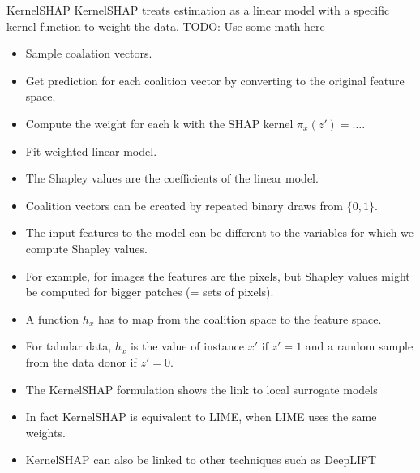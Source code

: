 \documentclass[10pt,compress,t,notes=noshow, xcolor=table]{beamer}
\begin{document}
\begin{vbframe}{KernelSHAP}
KernelSHAP treats estimation as a linear model with a specific kernel function to weight the data. TODO: Use some math here

  \begin{itemize}
    \item Sample coalation vectors.
    \item Get prediction for each coalition vector by converting to the original feature space.
    \item Compute the weight for each k with the SHAP kernel $\pi_x(z') = \ldots $.
    \item Fit weighted linear model.
    \item The Shapley values are the coefficients of the linear model.
  \end{itemize}

\framebreak

\begin{itemize}
  \item Coalition vectors can be created by repeated binary draws from $\{0,1\}$.
  \item The input features to the model can be different to the variables for which we compute Shapley values.
  \item For example, for images the features are the pixels, but Shapley values might be computed for bigger patches (= sets of pixels).
  \item A function $h_x$ has to map from the coalition space to the feature space.
  \item For tabular data, $h_x$ is the value of instance $x'$ if $z' = 1$ and a random sample from the data donor if $z' = 0$.
\end{itemize}

\framebreak
  \begin{itemize}
      \item The KernelSHAP formulation shows the link to local surrogate models
      \item In fact KernelSHAP is equivalent to LIME, when LIME uses the same weights.
      \item KernelSHAP can also be linked to other techniques such as DeepLIFT
  \end{itemize}

\end{vbframe}
\end{document}
